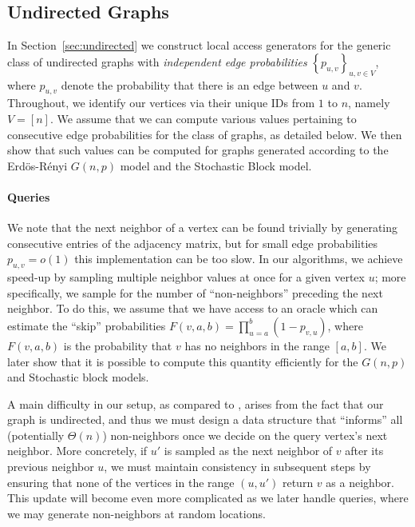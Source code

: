 \subsection{Undirected Graphs}
\label{sec:undirected_graphs}

In Section~\ref{sec:undirected} we construct local access generators for the generic
class of undirected graphs
with {\em independent edge probabilities} $\left\{ p_{u,v} \right\}_{u,v\in V}$,
where $p_{u,v}$ denote the probability that there is an edge between $u$ and $v$.
Throughout, we identify our vertices via their unique IDs from $1$ to $n$, namely $V = [n]$.
We assume that we can compute various values pertaining to consecutive
edge probabilities for the class of graphs, as detailed below.
We then show that such values can be computed for graphs
generated according to the Erd\"{o}s-R\'{e}nyi $G(n,p)$ model
and the Stochastic Block model.

\paragraph{ Queries}
\label{par:next_neighbor_queries}
We note that the next neighbor of a vertex can be found trivially by generating consecutive
entries of the adjacency matrix, but for small edge probabilities $p_{u,v} = o(1)$
this implementation can be too slow.  In our algorithms, we achieve speed-up by sampling multiple 
neighbor values at once for a given vertex $u$; more specifically,  
we sample for the number of ``non-neighbors'' preceding
the next neighbor.
To do this, we assume that we have access to
an oracle which can estimate the ``skip'' probabilities 
$F(v,a,b)=\prod^{b}_{u=a} (1-p_{v,u})$,
where $F(v,a,b)$ is the probability that $v$ 
has no neighbors in the range $[a,b]$.
We later show that it is possible to compute this quantity efficiently
for the $G(n,p)$ and Stochastic block models.

A main difficulty in our setup, as compared to \cite{reut},
arises from the fact that our graph is undirected, and thus
we must design a data structure that ``informs'' all (potentially $\Theta(n)$) non-neighbors once we decide on the query vertex's next neighbor.
More concretely, if $u'$ is sampled as the next neighbor of $v$ after its previous neighbor $u$,
we must maintain consistency in subsequent steps
by ensuring that none of the vertices in the range $(u,u')$
return $v$ as a neighbor. This update will become even more complicated as we later handle  queries, where we may generate non-neighbors at random locations.

